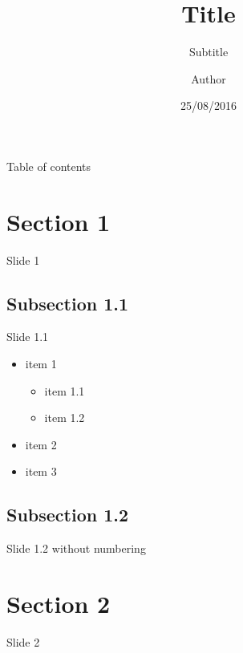 \documentclass{beamer}
\title{Title}
\subtitle{Subtitle}
\date{25/08/2016}
\author{Author}
\begin{document}
    \begin{frame}
        \maketitle
    \end{frame}
    
    \begin{frame}{Table of contents}
      \tableofcontents
    \end{frame}
    
    \section{Section 1}
    \begin{frame}{Slide 1}
        \lipsum[1]
    \end{frame}
    
    \subsection{Subsection 1.1}
    \begin{frame}{Slide 1.1}
        \begin{itemize}
            \item item 1
            \begin{itemize}
                \item item 1.1
                \item item 1.2
            \end{itemize}
            \item item 2
            \item item 3
        \end{itemize}
    \end{frame}
    
    \subsection{Subsection 1.2}
    \begin{frame}[plain]{Slide 1.2 without numbering}
        \lipsum[2]
        \addtocounter{page}{-1}
    \end{frame}
    
    \section{Section 2}
    \begin{frame}{Slide 2}
        \lipsum[3]
    \end{frame}
\end{document}
